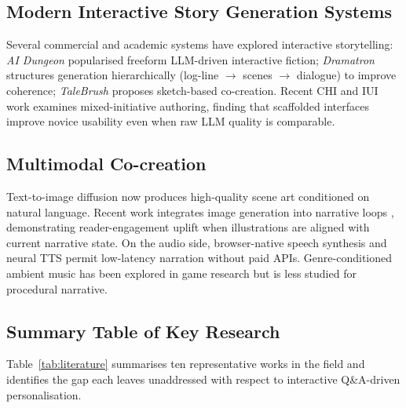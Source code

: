 \subsection{Modern Interactive Story Generation Systems}
Several commercial and academic systems have explored interactive
storytelling: \emph{AI Dungeon} \cite{walton2019aidungeon} popularised
freeform LLM-driven interactive fiction; \emph{Dramatron}
\cite{mirowski2023dramatron} structures generation hierarchically
(log-line $\rightarrow$ scenes $\rightarrow$ dialogue) to improve
coherence; \emph{TaleBrush} \cite{chung2022talebrush} proposes
sketch-based co-creation. Recent CHI and IUI work
\cite{liu2023endusers,yuan2022wordcraft} examines mixed-initiative
authoring, finding that scaffolded interfaces improve novice usability
even when raw LLM quality is comparable.

\subsection{Multimodal Co-creation}
Text-to-image diffusion
\cite{ramesh2022unclip,rombach2022ldm,podell2024sdxl,bfl2024flux}
now produces high-quality scene art conditioned on natural language.
Recent work integrates image generation into narrative loops
\cite{schuhmann2024visualstory,bouhuis2024crossmodal}, demonstrating
reader-engagement uplift when illustrations are aligned with current
narrative state. On the audio side, browser-native speech synthesis
\cite{w3c2024webspeech} and neural TTS \cite{casanova2024xtts} permit
low-latency narration without paid APIs. Genre-conditioned ambient
music has been explored in game research \cite{lopezrincon2024music}
but is less studied for procedural narrative.

\subsection{Summary Table of Key Research}
Table~\ref{tab:literature} summarises ten representative works in
the field and identifies the gap each leaves unaddressed with respect
to interactive Q\&A-driven personalisation.

